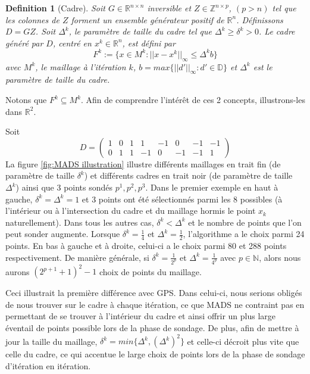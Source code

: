 \documentclass[french]{report}
\newtheorem{defn}{Definition}[section]
\newcommand{\definition}[2]{\begin{defn}[#1] #2 \end{defn}}
\newcommand{\D}{\mathbb{D}}
\begin{document}
\definition{Cadre}
{
    Soit $G \in \mathbb{R}^{n \times n}$ inversible et $Z \in \mathbb{Z}^{n \times p}$, $(p > n)$ tel que les colonnes de $Z$ forment un ensemble générateur positif de $\mathbb{R}^n$. Définissons $D=GZ$.
    Soit $\Delta^k$, le paramètre de taille du cadre tel que $\Delta^k \geq \delta^k > 0$.
    Le cadre généré par $D$, centré en $x^k \in \mathbb{R}^n$, est défini par
    $$
        F^k := \{ x\in M^k : || x-x^k ||_\infty \leq \Delta^k b \}
    $$
    avec $M^k$, le maillage à l'itération $k$, $b = max\{ || d' ||_\infty : d' \in \D \}$ et $\Delta^k$ est le paramètre de taille du cadre.
}

Notons que $F^k \subseteq M^k$.
Afin de comprendre l'intérêt de ces 2 concepts, illustrons-les dans $\mathbb{R}^2$.

Soit
$$
    D=\begin{pmatrix}
        1 & 0 & 1 & 1  & -1 & 0  & -1 & -1 \\
        0 & 1 & 1 & -1 & 0  & -1 & -1 & 1
    \end{pmatrix}
$$
La figure \ref{fig:MADS illustration} illustre différents maillages en trait fin (de paramètre de taille $\delta^k$) et différents cadres en trait noir (de paramètre de taille $\Delta^k$) ainsi que 3 points sondés $p^1,p^2,p^3$. Dans le premier exemple en haut à gauche, $\delta^k = \Delta^k = 1$ et 3 points ont été sélectionnés parmi les 8 possibles (à l'intérieur ou à l'intersection du cadre et du maillage hormis le point $x_k$ naturellement). Dans tous les autres cas, $\delta^k < \Delta^k$ et le nombre de points que l'on peut sonder augmente. Lorsque $\delta^k=\frac{1}{4}$ et $ \Delta^k = \frac{1}{2}$, l'algorithme a le choix parmi 24 points. En bas à gauche et à droite, celui-ci a le choix parmi 80 et 288 points respectivement. De manière générale, si $\delta^k = \frac{1}{2^p}$ et $\Delta^k = \frac{1}{4^p}$ avec $p \in \mathbb{N}$, alors nous aurons $(2^{p+1} +1)^2 -1$ choix de points du maillage.

Ceci illustrait la première différence avec GPS. Dans celui-ci, nous serions obligés de nous trouver sur le cadre à chaque itération, ce que MADS ne contraint pas en permettant de se trouver à l'intérieur du cadre et ainsi offrir un plus large éventail de points possible lors de la phase de sondage. De plus, afin de mettre à jour la taille du maillage, $\delta^k = min \{ \Delta^k,(\Delta^k)^2 \}$ et celle-ci décroit plus vite que celle du cadre, ce qui accentue le large choix de points lors de la phase de sondage d'itération en itération.
\end{document}
